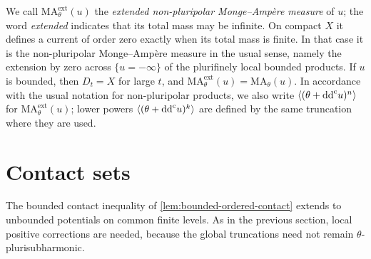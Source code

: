 We call $\mathrm{MA}^{\mathrm{ext}}_\theta(u)$ the \emph{extended non-pluripolar Monge--Amp\`ere measure} of $u$; the word \emph{extended} indicates that its total mass may be infinite. On compact $X$ it defines a current of order zero exactly when its total mass is finite. In that case it is the non-pluripolar Monge--Amp\`ere measure in the usual sense, namely the extension by zero across $\{u=-\infty\}$ of the plurifinely local bounded products. If $u$ is bounded, then $D_t=X$ for large $t$, and $\mathrm{MA}^{\mathrm{ext}}_\theta(u)=\mathrm{MA}_\theta(u)$. In accordance with the usual notation for non-pluripolar products, we also write $\langle(\theta+\mathrm{dd}^{\mathrm{c}} u)^n\rangle$ for $\mathrm{MA}^{\mathrm{ext}}_\theta(u)$; lower powers $\langle(\theta+\mathrm{dd}^{\mathrm{c}} u)^k\rangle$ are defined by the same truncation where they are used.

\section{Contact sets}

The bounded contact inequality of \cref{lem:bounded-ordered-contact} extends to unbounded potentials on common finite levels. As in the previous section, local positive corrections are needed, because the global truncations need not remain $\theta$-plurisubharmonic.

